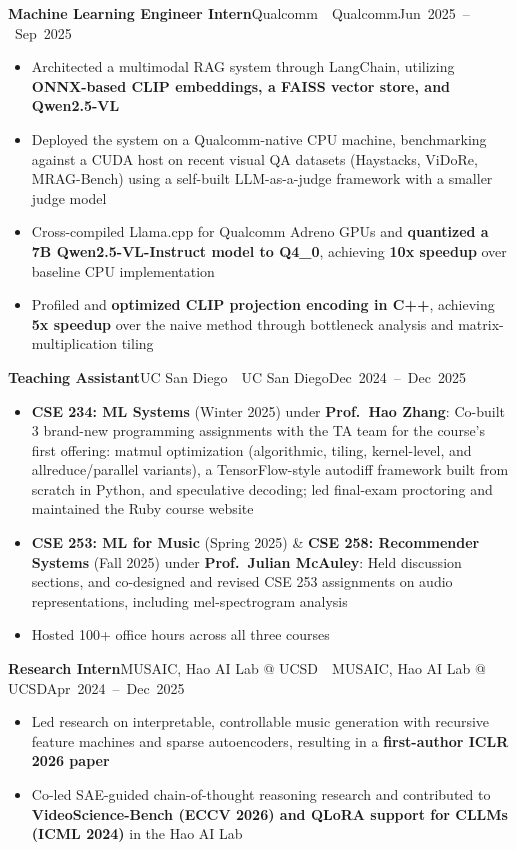 \documentclass[letterpaper,11pt]{article}
\newcommand{\entry}[3]{%
  \needspace{4\baselineskip}%
  \textbf{#1}\ifx\relax#2\relax\else\ \textbar\ #2\fi\hfill\mbox{#3}\par}
\newenvironment{bullets}
  {\begin{itemize}[leftmargin=1.2em, label=\textbullet, itemsep=0.5pt, parsep=0pt, topsep=2pt]}
  {\end{itemize}\vspace{5pt}}
\begin{document}
\newpage
\entry{Machine Learning Engineer Intern}{Qualcomm}{Jun 2025 -- Sep 2025}
\begin{bullets}
  \item Architected a multimodal RAG system through LangChain, utilizing \textbf{ONNX-based CLIP embeddings, a FAISS vector store, and Qwen2.5-VL}
  \item Deployed the system on a Qualcomm-native CPU machine, benchmarking against a CUDA host on recent visual QA datasets (Haystacks, ViDoRe, MRAG-Bench) using a self-built LLM-as-a-judge framework with a smaller judge model
  \item Cross-compiled Llama.cpp for Qualcomm Adreno GPUs and \textbf{quantized a 7B Qwen2.5-VL-Instruct model to Q4\_0}, achieving \textbf{10x speedup} over baseline CPU implementation
  \item Profiled and \textbf{optimized CLIP projection encoding in C++}, achieving \textbf{5x speedup} over the naive method through bottleneck analysis and matrix-multiplication tiling
\end{bullets}

\entry{Teaching Assistant}{UC San Diego}{Dec 2024 -- Dec 2025}
\begin{bullets}
  \item \textbf{CSE 234: ML Systems} (Winter 2025) under \textbf{Prof.\ Hao Zhang}: Co-built 3 brand-new programming assignments with the TA team for the course's first offering: matmul optimization (algorithmic, tiling, kernel-level, and allreduce/parallel variants), a TensorFlow-style autodiff framework built from scratch in Python, and speculative decoding; led final-exam proctoring and maintained the Ruby course website
  \item \textbf{CSE 253: ML for Music} (Spring 2025) \& \textbf{CSE 258: Recommender Systems} (Fall 2025) under \textbf{Prof.\ Julian McAuley}: Held discussion sections, and co-designed and revised CSE 253 assignments on audio representations, including mel-spectrogram analysis
  \item Hosted 100+ office hours across all three courses
\end{bullets}

\entry{Research Intern}{MUSAIC, Hao AI Lab @ UCSD}{Apr 2024 -- Dec 2025}
\begin{bullets}
  \item Led research on interpretable, controllable music generation with recursive feature machines and sparse autoencoders, resulting in a \textbf{first-author ICLR 2026 paper}
  \item Co-led SAE-guided chain-of-thought reasoning research and contributed to \textbf{VideoScience-Bench (ECCV 2026) and QLoRA support for CLLMs (ICML 2024)} in the Hao AI Lab
\end{bullets}
\end{document}
